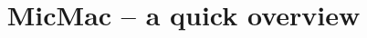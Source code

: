 \documentclass{beamer}
\title{MicMac -- a quick overview}
\date{}
\begin{document}
\begin{frame}[plain]
\titlepage{}
\end{frame}

\tableofcontents


\end{document}
